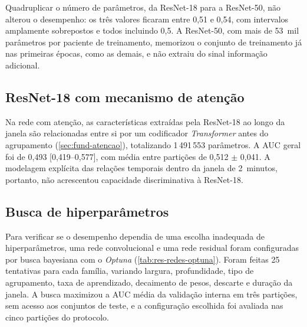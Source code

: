Quadruplicar o número de parâmetros, da ResNet-18 para a ResNet-50, não
alterou o desempenho: os três valores ficaram entre 0,51 e 0,54, com
intervalos amplamente sobrepostos e todos incluindo 0,5. A ResNet-50, com
mais de 53~mil parâmetros por paciente de treinamento, memorizou o conjunto
de treinamento já nas primeiras épocas, como as demais, e não extraiu do
sinal informação adicional.

\subsection{ResNet-18 com mecanismo de atenção}
\label{subsec:res-resnet-atencao}

Na rede com atenção, as características extraídas pela ResNet-18 ao
longo da janela são relacionadas entre si por um codificador
\textit{Transformer} antes do agrupamento (\autoref{sec:fund-atencao}),
totalizando 1\,491\,553 parâmetros. A \gls{AUC} geral foi de
0,493 [0,419--0,577], com média entre partições de 0,512 $\pm$ 0,041. A
modelagem explícita das relações temporais dentro da janela de 2~minutos,
portanto, não acrescentou capacidade discriminativa à ResNet-18.

\subsection{Busca de hiperparâmetros}
\label{subsec:res-redes-optuna}

Para verificar se o desempenho dependia de uma escolha inadequada de
hiperparâmetros, uma rede convolucional e uma rede residual foram
configuradas por busca bayesiana com o \textit{Optuna}
(\autoref{tab:res-redes-optuna}). Foram feitas 25 tentativas para cada
família, variando largura, profundidade, tipo de agrupamento, taxa de
aprendizado, decaimento de pesos, descarte e duração da janela. A busca
maximizou a \gls{AUC} média da validação interna em três partições, sem
acesso aos conjuntos de teste, e a configuração escolhida foi avaliada nas
cinco partições do protocolo.

